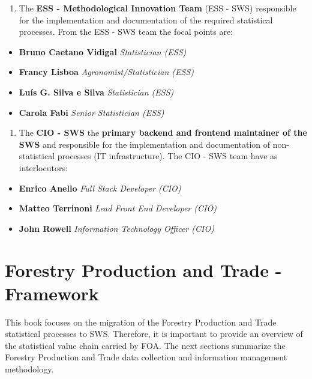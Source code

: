 \documentclass[
]{book}
\providecommand{\tightlist}{%
  \setlength{\itemsep}{0pt}\setlength{\parskip}{0pt}}
\begin{document}
\begin{enumerate}
\def\labelenumi{\arabic{enumi}.}
\setcounter{enumi}{1}
\tightlist
\item
  The \textbf{ESS - Methodological Innovation Team} (ESS - SWS) responsible for the implementation and documentation of the required statistical processes. From the ESS - SWS team the focal points are:
\end{enumerate}

\begin{itemize}
\tightlist
\item
  \textbf{Bruno Caetano Vidigal} \emph{Statistician (ESS)}
\item
  \textbf{Francy Lisboa} \emph{Agronomist/Statistician (ESS)}
\item
  \textbf{Luís G. Silva e Silva} \emph{Statistician (ESS)}
\item
  \textbf{Carola Fabi} \emph{Senior Statistician (ESS)}
\end{itemize}

\begin{enumerate}
\def\labelenumi{\arabic{enumi}.}
\setcounter{enumi}{2}
\tightlist
\item
  The \textbf{CIO - SWS} the \textbf{primary backend and frontend maintainer of the SWS} and responsible for the implementation and documentation of non-statistical processes (IT infrastructure). The CIO - SWS team have as interlocutors:
\end{enumerate}

\begin{itemize}
\tightlist
\item
  \textbf{Enrico Anello} \emph{Full Stack Developer (CIO)}
\item
  \textbf{Matteo Terrinoni} \emph{Lead Front End Developer (CIO)}
\item
  \textbf{John Rowell} \emph{Information Technology Officer (CIO)}
\end{itemize}

\hypertarget{ForestryFramework}{%
\chapter{\texorpdfstring{\textbf{Forestry Production and Trade - Framework}}{Forestry Production and Trade - Framework}}\label{ForestryFramework}}

This book focuses on the migration of the Forestry Production and Trade statistical processes to SWS. Therefore, it is important to provide an overview of the statistical value chain carried by FOA. The next sections summarize the Forestry Production and Trade data collection and information management methodology.
\end{document}
